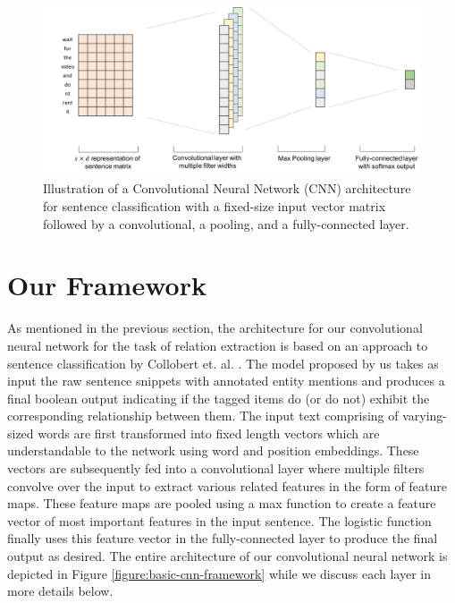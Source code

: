 \begin{figure}[ht]
    \centering
    \includegraphics[width=0.85\linewidth]{Images/CNN-TextClassification-Example.png}
    \caption{Illustration of a Convolutional Neural Network (CNN) architecture for sentence classification with a fixed-size input vector matrix followed by a convolutional, a pooling, and a fully-connected layer.}
    \label{figure:cnn-textclassification-example}
\end{figure}

\section{Our Framework}
\label{section:our-framework}

As mentioned in the previous section, the architecture for our convolutional neural network for the task of relation extraction is based on an approach to sentence classification by Collobert et. al. \cite{collobert2011natural}. The model proposed by us takes as input the raw sentence snippets with annotated entity mentions and produces a final boolean output indicating if the tagged items do (or do not) exhibit the corresponding relationship between them. The input text comprising of varying-sized words are first transformed into fixed length vectors which are understandable to the network using word and position embeddings. These vectors are subsequently fed into a convolutional layer where multiple filters convolve over the input to extract various related features in the form of feature maps. These feature maps are pooled using a max function to create a feature vector of most important features in the input sentence. The logistic function finally uses this feature vector in the fully-connected layer to produce the final output as desired. The entire architecture of our convolutional neural network is depicted in Figure \ref{figure:basic-cnn-framework} while we discuss each layer in more details below. 

